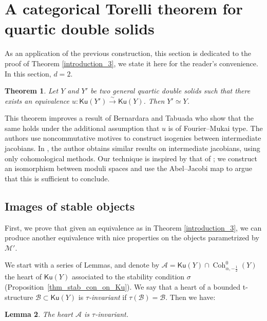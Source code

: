 \documentclass[11pt]{amsart}
\newtheorem{thm}{Theorem}[section]
\newtheorem{lemma}[thm]{Lemma}
\theoremstyle{definition}
\DeclareMathOperator{\Coh}{Coh}
\newcommand{\sA}{\mathcal{A}}
\newcommand{\sB}{\mathcal{B}}
\newcommand{\Ku}{\mathsf{Ku}}
\begin{document}
\section{A categorical Torelli theorem for quartic double solids}
\label{sec_Torelli}

 As an application of the previous construction, this section is dedicated to the proof of Theorem \ref{introduction_3}, we state it here for the reader's convenience. In this section, $d=2$.
 
\begin{thm}\label{thm_torelliY2}
Let $Y$ and $Y'$ be two general quartic double solids such that there exists an equivalence $u \colon \Ku(Y') \xrightarrow{\sim} \Ku(Y)$. Then $Y'\simeq Y$.
 \end{thm}
 
This theorem improves a result of Bernardara and Tabuada \cite[ Corollary~3.1 (iii)]{BT16} who show that the same holds under the additional assumption that $u$ is of Fourier--Mukai type. The authors use noncommutative motives to construct isogenies between intermediate jacobians. In \cite{perry2020integral}, the author obtains similar results on intermediate jacobians, using only cohomological methods. Our technique is inspired by that of \cite{BMMS12}; we construct an isomorphism between moduli spaces and use the Abel--Jacobi map to argue that this is sufficient to conclude.



\subsection{Images of stable objects} First, we prove that given an equivalence as in Theorem \ref{introduction_3}, we can produce another equivalence with nice properties on the objects parametrized by $\mathcal{M}'$. 

We start with a series of Lemmas, and denote by $\mathcal{A}= \Ku(Y) \cap \Coh^0_{\alpha,-\frac{1}{2}}(Y)$ the heart of $\Ku(Y)$ associated to the stability condition $\sigma$ (Proposition~\ref{thm_stab_con_on_Ku}). We say that a heart of a bounded t-structure $\sB\subset \Ku(Y)$ is \textit{$\tau$-invariant} if $\tau(\sB)=\sB$. Then we have:

\begin{lemma}%
The heart $\sA$ is $\tau$-invariant.
\end{lemma}
\end{document}
